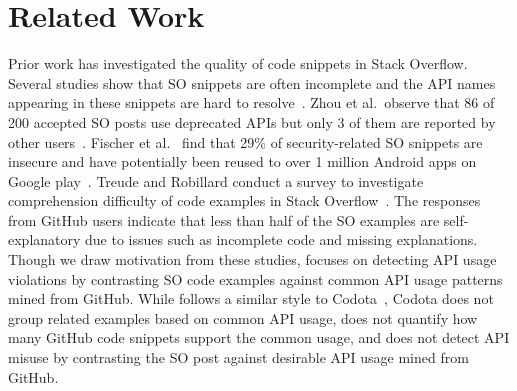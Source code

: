 \section{Related Work} 
Prior work has investigated the quality of code snippets in Stack Overflow. Several studies show that SO snippets are often incomplete and the API names appearing in these snippets are hard to resolve~\cite{dagenais2012recovering, subramanian2014live}. Zhou et al.~observe that 86 of 200 accepted SO posts use deprecated APIs but only 3 of them are reported by other users~\cite{zhou2016api}. Fischer et al.~ find that 29\% of security-related SO snippets are insecure and have potentially been reused to over 1 million Android apps on Google play~\cite{fischer2017stack}. Treude and Robillard conduct a survey to investigate comprehension difficulty of code examples in Stack Overflow~\cite{treude2017understanding}. The responses from GitHub users indicate that less than half of the SO examples are self-explanatory due to issues such as incomplete code and missing explanations. Though we draw motivation from these studies, {\tool} focuses on detecting API usage violations by contrasting SO code examples against common API usage patterns mined from GitHub. While {\tool} follows a similar style to Codota~\cite{codota}, Codota does not group related examples based on common API usage, does not quantify how many GitHub code snippets support the common usage, and does not detect API misuse by contrasting the SO post against desirable API usage mined from GitHub.


